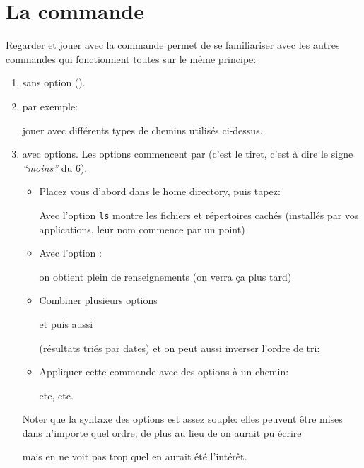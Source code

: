 \section{La commande }
Regarder et jouer avec la commande   permet de se familiariser
avec les autres commandes qui fonctionnent toutes sur le même
principe:
\begin{enumerate}
\item {}

  sans option ().
\item {}

  par exemple:


  \exo{} jouer avec
  différents types de chemins utilisés ci-dessus.
  
\item {} avec  options. Les options
  commencent par \com{-} (c'est le tiret, c'est à dire le signe
  \textsl{``moins''} du 6). 
  \begin{itemize}
  \item Placez vous d'abord  dans le home directory, puis tapez:


    Avec l'option  \texttt{ls} montre les
      fichiers et répertoires cachés (installés par vos applications,
      leur nom commence par un point) 
    \item Avec l'option :


      on obtient  plein de renseignements (on verra
      ça plus tard)  
    \item Combiner plusieurs options


      et puis aussi

      (résultats triés par dates) et on peut aussi
      inverser l'ordre de tri:

       
    \item  Appliquer cette commande avec des options à un chemin:
      

      etc, etc. 
  \end{itemize}

  Noter que la syntaxe des options est assez souple: elles peuvent
  être mises dans n'importe quel ordre; de plus  au lieu de  on aurait pu écrire

  
  mais en ne voit pas trop quel en aurait été l'intérêt.
\end{enumerate}

